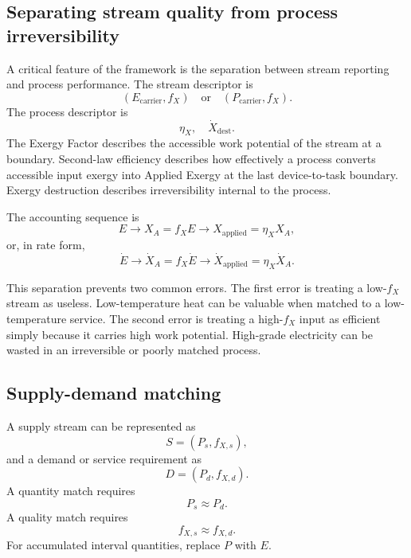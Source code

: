 \documentclass[11pt]{article}
\newcommand{\fx}{f_X}
\newcommand{\XA}{X_A}
\newcommand{\XdotA}{\dot{X}_A}
\newcommand{\Xap}{X_{\mathrm{applied}}}
\newcommand{\Xdotap}{\dot{X}_{\mathrm{applied}}}
\newcommand{\Xdest}{\dot{X}_{\mathrm{dest}}}
\newcommand{\carrier}{\mathrm{carrier}}
\begin{document}
\subsection{Separating stream quality from process irreversibility}

A critical feature of the framework is the separation between stream reporting and process performance. The stream descriptor is
\begin{equation}
(E_{\carrier},\fx) \quad \mathrm{or} \quad (P_{\carrier},\fx).
\end{equation}
The process descriptor is
\begin{equation}
\eta_X,\quad \Xdest.
\end{equation}
The Exergy Factor describes the accessible work potential of the stream at a boundary. Second-law efficiency describes how effectively a process converts accessible input exergy into Applied Exergy at the last device-to-task boundary. Exergy destruction describes irreversibility internal to the process.

The accounting sequence is
\begin{equation}
E \longrightarrow \XA=\fx E \longrightarrow \Xap=\eta_X\XA,
\end{equation}
or, in rate form,
\begin{equation}
\dot{E} \longrightarrow \XdotA=\fx\dot{E} \longrightarrow \Xdotap=\eta_X\XdotA.
\end{equation}

This separation prevents two common errors. The first error is treating a low-$\fx$ stream as useless. Low-temperature heat can be valuable when matched to a low-temperature service. The second error is treating a high-$\fx$ input as efficient simply because it carries high work potential. High-grade electricity can be wasted in an irreversible or poorly matched process.

\subsection{Supply-demand matching}

A supply stream can be represented as
\begin{equation}
S=(P_s,f_{X,s}),
\end{equation}
and a demand or service requirement as
\begin{equation}
D=(P_d,f_{X,d}).
\end{equation}
A quantity match requires
\begin{equation}
P_s\approx P_d.
\end{equation}
A quality match requires
\begin{equation}
f_{X,s}\approx f_{X,d}.
\end{equation}
For accumulated interval quantities, replace $P$ with $E$.
\end{document}
